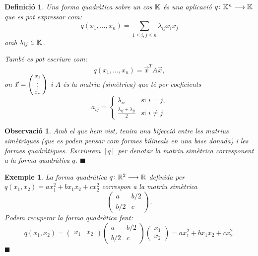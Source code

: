\documentclass[
  11pt,
]{book}
\numberwithin{dummy}{section}
\theoremstyle{maincolornumbox}
\newtheorem{remarkT}{Observació}[chapter]
\theoremstyle{blacknumex}
\newtheorem{exampleT}{Exemple}[chapter]
\theoremstyle{blacknumbox}
\newtheorem{definitionT}{Definició}[chapter]
\theoremstyle{maincolornum}
\newenvironment{definition}{\begin{dBox}\begin{definitionT}}{\end{definitionT}\end{dBox}}
\newenvironment{example}{\begin{exampleT}}{\hfill{\tiny\ensuremath{\blacksquare}}\end{exampleT}}
\newenvironment{remark}{\begin{remarkT}}{\hfill{\tiny\ensuremath{\blacksquare}}\end{remarkT}}
\newlength\esp
\begin{document}
\begin{definition}
Una \emph{forma quadràtica} sobre un cos \(\mathbb{K}\) és una aplicació
\(q\colon \mathbb{K}^n\longrightarrow \mathbb{K}\) que es pot expressar com:
\[q(x_1, \dots , x_n)=\sum_{1\leq i , j \leq n} \lambda_{ij}x_i x_j\]
amb \(\lambda_{ij}\in \mathbb{K}\).

També es pot escriure com: \[q(x_1, \dots , x_n)= \vec x^T A \vec x ,\]
on \(\vec x=\left(\begin{smallmatrix}x_1 \\ \vdots \\ x_n\end{smallmatrix}\right)\) i \(A\) és la matriu (simètrica)
que té per coeficients
\[a_{ij}=\begin{cases} \lambda_{ii} & \text{si $i=j$,} \\ \frac{\lambda_{ij}+\lambda_{ji}}{2} & \text{si $i\neq j$.}\end{cases}\]
\end{definition}

\begin{remark}
Amb el que hem vist, tenim una bijecció entre les matrius simètriques
(que es poden pensar com formes bilineals en una base donada) i les
formes quadràtiques. Escriurem \([q]\) per denotar la matriu simètrica
corresponent a la forma quadràtica \(q\).
\end{remark}

\begin{example}
La forma quadràtica \(q\colon \mathbb{R}^2 \longrightarrow \mathbb{R}\) definida per
\(q(x_1,x_2)=ax_1^2+bx_1x_2+cx_2^2\) correspon a la matriu simètrica
\[\begin{pmatrix}
a & b/2 \\ b/2 & c
\end{pmatrix} .\] Podem recuperar la forma quadràtica fent:
\[q(x_1,x_2)=\begin{pmatrix} x_1 & x_2 \end{pmatrix}\begin{pmatrix}
a & b/2 \\ b/2 & c
\end{pmatrix} \begin{pmatrix} x_1 \\ x_2 \end{pmatrix}=ax_1^2 + bx_1x_2+cx_2^2 .\]
\end{example}
\end{document}
